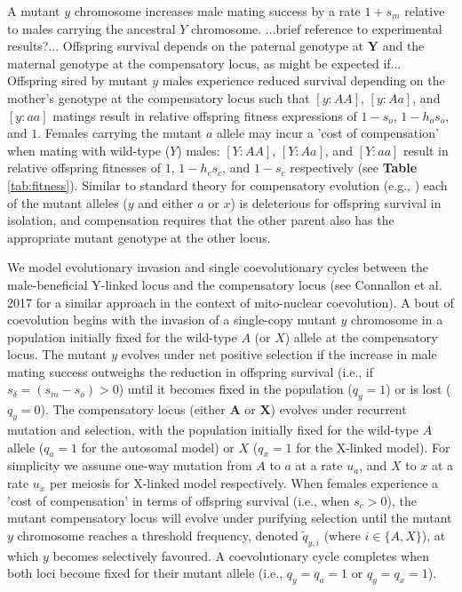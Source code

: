 \documentclass{article}
\newcommand\hl[1]{%
  \bgroup
  \hskip0pt\color{blue!80!black}%
  #1%
  \egroup
}
\begin{document}
A mutant $y$ chromosome increases male mating success by a rate $1 + s_m$ relative to males carrying the ancestral $Y$ chromosome. \hl{...brief reference to experimental results?...} Offspring survival depends on the paternal genotype at $\mathbf{Y}$ and the maternal genotype at the compensatory locus, \hl{as might be expected if...} Offspring sired by mutant $y$ males experience reduced survival depending on the mother's genotype at the compensatory locus such that $[y:AA]$, $[y:Aa]$, and $[y:aa]$ matings result in relative offspring fitness expressions of $1 - s_o$, $1 - h_o s_o$, and $1$. Females carrying the mutant $a$ allele may incur a 'cost of compensation' when mating with wild-type ($Y$) males: $[Y:AA]$, $[Y:Aa]$, and $[Y:aa]$ result in relative offspring fitnesses of $1$, $1 - h_c s_c$, and $1 - s_c$ respectively (see {\bf Table} \ref{tab:fitness}). Similar to standard theory for compensatory evolution (e.g., \citealt{Kimura1985,Stephan1996,WeinreichChao2005}) each of the mutant alleles ($y$ and either $a$ or $x$) is deleterious for offspring survival in isolation, and compensation requires that the other parent also has the appropriate mutant genotype at the other locus.

We model evolutionary invasion and single coevolutionary cycles between the male-beneficial Y-linked locus and the compensatory locus (see Connallon et al. 2017 for a similar approach in the context of mito-nuclear coevolution). A bout of coevolution begins with the invasion of a single-copy mutant $y$ chromosome in a population initially fixed for the wild-type $A$ (or $X$) allele at the compensatory locus. The mutant $y$ evolves under net positive selection if the increase in male mating success outweighs the reduction in offspring survival (i.e., if $s_{\delta} = (s_m - s_o) > 0$) until it becomes fixed in the population ($q_y = 1$) or is lost ($q_y = 0$). The compensatory locus (either $\mathbf{A}$ or $\mathbf{X}$) evolves under recurrent mutation and selection, with the population initially fixed for the wild-type $A$ allele ($q_a = 1$ for the autosomal model) or $X$ ($q_x = 1$ for the X-linked model). For simplicity we assume one-way mutation from $A$ to $a$ at a rate $u_a$, and $X$ to $x$ at a rate $u_x$ per meiosis for X-linked model respectively. When females experience a 'cost of compensation' in terms of offspring survival (i.e., when $s_c > 0$), the mutant compensatory locus will evolve under purifying selection until the mutant $y$ chromosome reaches a threshold frequency, denoted $\tilde{q}_{y,i}$ (where $i \in \{A,X\}$), at which $y$ becomes selectively favoured. A coevolutionary cycle completes when both loci become fixed for their mutant allele (i.e., $q_y = q_a = 1$ or $q_y = q_x = 1$).
\end{document}
